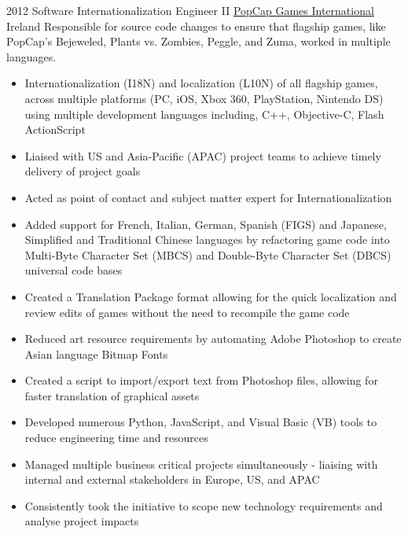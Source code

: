 
\begin{twenty}
  {2012}
  {Software Internationalization Engineer II}
  {\href{https://www.popcap.com/}{PopCap Games International}}
  {Ireland}
  {Responsible for source code changes to ensure that flagship games, like PopCap's Bejeweled, Plants vs. Zombies, Peggle, and Zuma, worked in multiple languages.}
  {\begin{itemize}
    \item Internationalization (I18N) and localization (L10N) of all flagship games, across multiple platforms (PC, iOS, Xbox 360, PlayStation, Nintendo DS) using multiple development languages including, C++, Objective-C, Flash ActionScript
    \item Liaised with US and Asia-Pacific (APAC) project teams to achieve timely delivery of project goals
    \item Acted as point of contact and subject matter expert for Internationalization
  \end{itemize}
  }
  {\begin{itemize}
    \item Added support for French, Italian, German, Spanish (FIGS) and Japanese, Simplified and Traditional Chinese languages by refactoring game code into Multi-Byte Character Set (MBCS) and Double-Byte Character Set (DBCS) universal code bases
    \item Created a Translation Package format allowing for the quick localization and review edits of games without the need to recompile the game code
    \item Reduced art resource requirements by automating Adobe Photoshop to create Asian language Bitmap Fonts
    \item Created a script to import/export text from Photoshop files, allowing for faster translation of graphical assets
    \item Developed numerous Python, JavaScript, and Visual Basic (VB) tools to reduce engineering time and resources
    \item Managed multiple business critical projects simultaneously - liaising with internal and external stakeholders in Europe, US, and APAC
    \item Consistently took the initiative to scope new technology requirements and analyse project impacts
  \end{itemize}
  }
\end{twenty}

